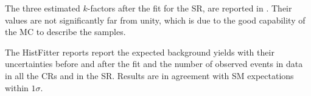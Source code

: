 The three estimated $k$-factors after the fit for the SR, are reported in \Tab{\ref{tab:kfactors}}. Their values are not significantly far from unity, which is due to the good capability of the MC to describe the samples.

The HistFitter \Tab{\ref{table.results.systematics.in.logL.fit.table.results.yields}} reports report the expected background yields with their uncertainties before and after the fit and the number of observed events in data in all the CRs and in the SR. Results are in agreement with SM expectations within $1\sigma$.










